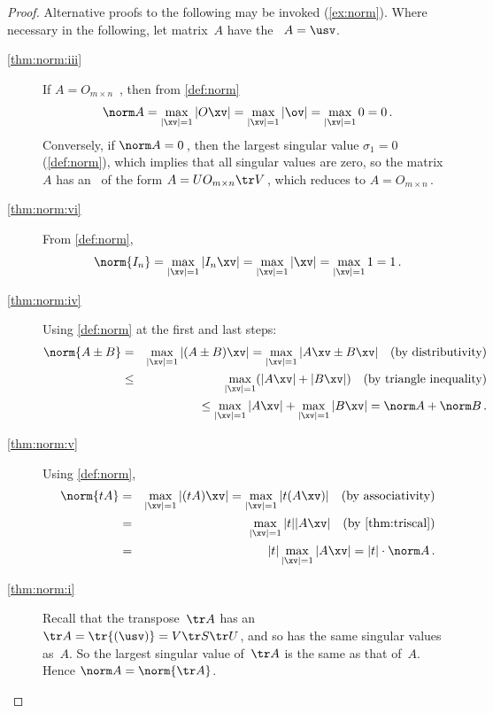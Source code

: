 \begin{proof}  Alternative proofs to the following may be invoked (\cref{ex:norm}).
Where necessary in the following, let matrix~\(A\) have the \svd\ \(A=\usv\).
\begin{description}
\item[\ref{thm:norm:iii}]
If \(A=O_{m\times n}\) \,,
then from \cref{def:norm} 
\begin{equation*}
\norm A=\max_{|\xv|=1}|O\xv|
=\max_{|\xv|=1}|\ov|=\max_{|\xv|=1}0=0\,.
\end{equation*}
Conversely, if \(\norm A=0\)\,, then the largest singular value \(\sigma_1=0\) (\cref{def:norm}), which implies that all singular values are zero, so the matrix~\(A\) has an \svd\ of the form \(A=UO_{m\times n}\tr V\)\,, which reduces to \(A=O_{m\times n}\)\,.

\item[\ref{thm:norm:vi}] From \cref{def:norm}, 
\begin{equation*}
\norm{I_n}=\max_{|\xv|=1}|I_n\xv|
=\max_{|\xv|=1}|\xv|
=\max_{|\xv|=1}1
=1\,.
\end{equation*}


\item[\ref{thm:norm:iv}]
Using \cref{def:norm} at the first and last steps:
\begin{eqnarray*}
\norm{A\pm B}
&=&\max_{|\xv|=1}|(A\pm B)\xv|
=\max_{|\xv|=1}|A\xv\pm B\xv|
\quad(\text{by distributivity})
\\&\leq&\max_{|\xv|=1}(|A\xv|+ |B\xv|)
\quad(\text{by triangle inequality})
\\&&{}\leq\max_{|\xv|=1}|A\xv|+ \max_{|\xv|=1}|B\xv|
=\norm A+ \norm B\,.
\end{eqnarray*}

\item[\ref{thm:norm:v}]
Using \cref{def:norm},
\begin{eqnarray*}
\norm{tA}
&=&\max_{|\xv|=1}|(tA)\xv|
=\max_{|\xv|=1}|t(A\xv)|
\quad(\text{by associativity})
\\&=&\max_{|\xv|=1}|t||A\xv|
\quad(\text{by \cref{thm:triscal}})
\\&=&|t|\max_{|\xv|=1}|A\xv|
=|t|\cdot\norm A\,.
\end{eqnarray*}

\item[\ref{thm:norm:i}]
Recall that the transpose~\(\tr A\) has an \svd\ \(\tr A=\tr{(\usv)}=V\tr S\tr U\), and so has the same singular values as~\(A\).
So the largest singular value of~\(\tr A\) is the same as that of~\(A\).
Hence \(\norm A=\norm{\tr A}\).


\end{description}
\end{proof}
